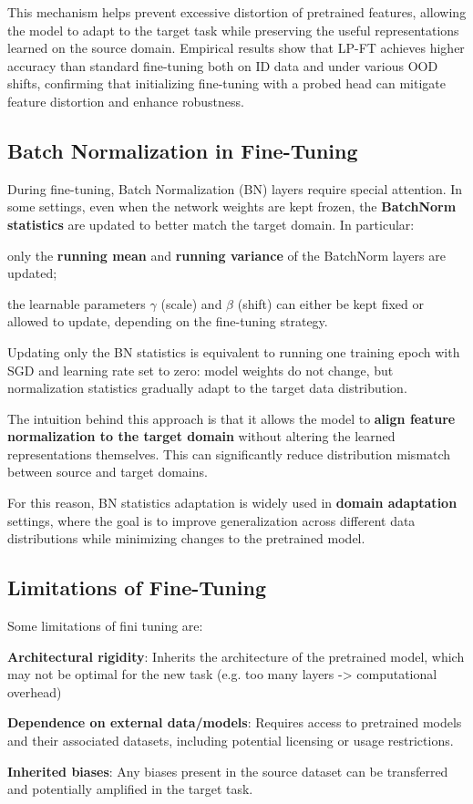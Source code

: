 This mechanism helps prevent excessive distortion of pretrained features, allowing the model
to adapt to the target task while preserving the useful representations learned on the source
domain.
Empirical results show that LP-FT achieves higher accuracy than standard fine-tuning both on
ID data and under various OOD shifts, confirming that initializing fine-tuning with a probed
head can mitigate feature distortion and enhance robustness.

\subsection{Batch Normalization in Fine-Tuning}
During fine-tuning, Batch Normalization (BN) layers require special attention.
In some settings, even when the network weights are kept frozen, the \textbf{BatchNorm
statistics} are updated to better match the target domain.
In particular:
\begin{compactitemize}
    \item only the \textbf{running mean} and \textbf{running variance} of the BatchNorm layers are
    updated;
    \item the learnable parameters $\gamma$ (scale) and $\beta$ (shift) can either be kept fixed
    or allowed to update, depending on the fine-tuning strategy.
\end{compactitemize}

Updating only the BN statistics is equivalent to running one training epoch with SGD and
learning rate set to zero: model weights do not change, but normalization statistics gradually
adapt to the target data distribution.

The intuition behind this approach is that it allows the model to \textbf{align feature
normalization to the target domain} without altering the learned representations themselves.
This can significantly reduce distribution mismatch between source and target domains.

For this reason, BN statistics adaptation is widely used in \textbf{domain adaptation} settings,
where the goal is to improve generalization across different data distributions while
minimizing changes to the pretrained model.

\subsection{Limitations of Fine-Tuning}
Some limitations of fini tuning are:
\begin{compactitemize}
    \item \textbf{Architectural rigidity}: Inherits the architecture of the pretrained model, which may not be optimal for the new task (e.g. too many layers -> computational overhead)
    \item \textbf{Dependence on external data/models}: Requires access to pretrained models and their associated datasets, including potential licensing or usage restrictions.
    \item \textbf{Inherited biases}: Any biases present in the source dataset can be transferred and potentially amplified in the target task.
\end{compactitemize}

